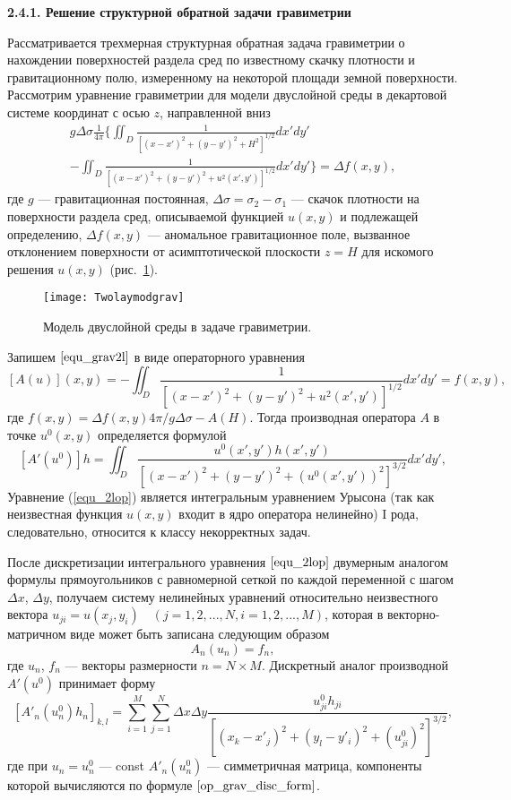 {\bfseries 2.4.1. Решение структурной обратной задачи гравиметрии} 

Рассматривается трехмерная структурная обратная задача гравиметрии о нахождении поверхностей раздела сред по известному скачку плотности и гравитационному полю, измеренному на некоторой площади земной поверхности.
Рассмотрим уравнение гравиметрии для модели двуслойной среды в декартовой системе координат с осью $z$, направленной вниз 
\begin{equation}\label{equ_grav2l}
\begin{aligned}
g\Delta\sigma\frac{1}{4\pi} \bigg\{ \iint_{D} \frac{1}{[(x-x')^2+(y-y')^2+H^2]^{1/2}}dx'dy' \\
- 
\iint_{D} \frac{1}{[(x-x')^2+(y-y')^2+u^2(x',y')]^{1/2}}dx'dy'\bigg\}=\Delta f(x,y),
\end{aligned} 
\end{equation}
где $g$ --- гравитационная постоянная, $\Delta\sigma=\sigma_2-\sigma_1$ --- скачок плотности на поверхности раздела сред, описываемой функцией $u(x,y)$ и подлежащей определению, $\Delta f(x,y)$ --- аномальное гравитационное поле, вызванное отклонением поверхности от асимптотической плоскости $z=H$ для искомого решения $u(x,y)$ (рис.~\ref{fig:twolayergrav}). 
\begin{figure}[H]
	\centering
	\texttt{[image: Twolaymodgrav]}
	\caption{Модель двуслойной среды в задаче гравиметрии.}
	\label{fig:twolayergrav}
	\end{figure}
Запишем $\eqref{equ_grav2l}$ в виде операторного уравнения
\begin{equation}\label{equ_2lop}
	[A(u)](x,y)=-\iint_{D} \frac{1}{[(x-x')^2+(y-y')^2+u^2(x',y')]^{1/2}}dx'dy'=f(x,y),
\end{equation}
где $f(x,y)=\Delta f(x,y) 4\pi/g\Delta\sigma - A(H)$. Тогда производная оператора $A$ в точке $u^0(x,y)$ определяется формулой
$$ [A'(u^0)]h=\iint_{D} \frac{u^0(x',y')h(x',y')}{[(x-x')^2+(y-y')^2+(u^0(x',y'))^2]^{3/2}}dx'dy', $$
Уравнение (\ref{equ_2lop}) является интегральным уравнением Урысона (так как неизвестная функция $u(x,y)$ входит в ядро оператора нелинейно) I рода, следовательно, относится к классу некорректных задач.
	
После дискретизации интегрального уравнения $\eqref{equ_2lop}$ двумерным аналогом формулы прямоугольников с равномерной сеткой по каждой переменной с шагом $\Delta x$, $\Delta y$, получаем систему нелинейных уравнений относительно неизвестного вектора $u_{ji}=u(x_j,y_i)\quad (j=1,2,...,N, i=1,2,...,M)$, которая в векторно-матричном виде может быть записана следующим образом
\begin{equation}\label{equ_snle}
	A_n(u_n)=f_n,
\end{equation}
где $u_n$, $f_n$ --- векторы размерности $n=N\times M$. Дискретный аналог производной $A'(u^0)$ принимает форму
\begin{equation}\label{op_grav_disc_form}
	[A'_n(u_n^0)h_n]_{k,l}=\sum\limits_{i=1}^{M}\sum\limits_{j=1}^{N}
	\Delta x\Delta y\frac{u^0_{ji}h_{ji}}{[(x_k-x'_j)^2+(y_l-y'_i)^2+(u^0_{ji})^2]^{3/2}},
\end{equation}
где при $u_n=u_{n}^{0}$ --- const $A'_n(u_n^0)$ --- симметричная матрица, компоненты которой вычисляются по формуле $\eqref{op_grav_disc_form}$.

